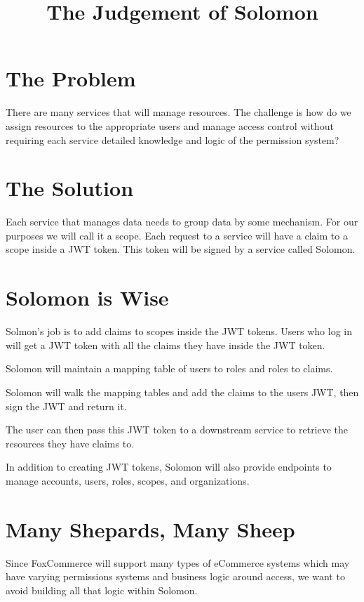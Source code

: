 \documentclass[11pt]{article}
\title{The Judgement of Solomon}
\begin{document}
\maketitle
\section{The Problem}

There are many services that will manage resources. The challenge is how do we
assign resources to the appropriate users and manage access control
without requiring each service detailed knowledge and logic of the permission
system?

\section{The Solution}

Each service that manages data needs to group data by some mechanism. For our
purposes we will call it a scope. Each request to a service will have a claim
to a scope inside a JWT token. This token will be signed by a service called 
Solomon.

\section{Solomon is Wise}

Solmon's job is to add claims to scopes inside the JWT tokens.
Users who log in will get a JWT token with all the claims they have inside
the JWT token.

Solomon will maintain a mapping table of users to roles and roles to claims. 

Solomon will walk the mapping tables and add the claims to the users JWT, then
sign the JWT and return it.

The user can then pass this JWT token to a downstream service to retrieve the
resources they have claims to.

In addition to creating JWT tokens, Solomon will also provide endpoints to manage
accounts, users, roles, scopes, and organizations.

\section{Many Shepards, Many Sheep}

Since FoxCommerce will support many types of eCommerce systems which may have
varying permissions systems and business logic around access, we want to avoid
building all that logic within Solomon.
\end{document}
